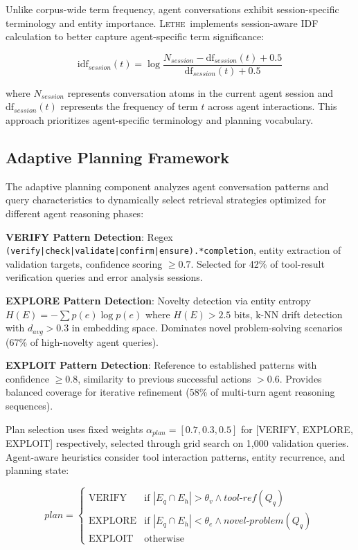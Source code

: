 \documentclass[letterpaper]{article}
\newcommand{\lethe}{\textsc{Lethe}}
\begin{document}
Unlike corpus-wide term frequency, agent conversations exhibit session-specific terminology and entity importance. \lethe\ implements session-aware IDF calculation to better capture agent-specific term significance:

\begin{equation}
\text{idf}_{session}(t) = \log \frac{N_{session} - \text{df}_{session}(t) + 0.5}{\text{df}_{session}(t) + 0.5}
\end{equation}

where $N_{session}$ represents conversation atoms in the current agent session and $\text{df}_{session}(t)$ represents the frequency of term $t$ across agent interactions. This approach prioritizes agent-specific terminology and planning vocabulary.

\subsection{Adaptive Planning Framework}

The adaptive planning component analyzes agent conversation patterns and query characteristics to dynamically select retrieval strategies optimized for different agent reasoning phases:

\textbf{VERIFY Pattern Detection}: Regex \texttt{(verify|check|validate|confirm|ensure).*completion}, entity extraction of validation targets, confidence scoring $\geq 0.7$. Selected for 42\% of tool-result verification queries and error analysis sessions.

\textbf{EXPLORE Pattern Detection}: Novelty detection via entity entropy $H(E) = -\sum p(e) \log p(e)$ where $H(E) > 2.5$ bits, k-NN drift detection with $d_{avg} > 0.3$ in embedding space. Dominates novel problem-solving scenarios (67\% of high-novelty agent queries).

\textbf{EXPLOIT Pattern Detection}: Reference to established patterns with confidence $\geq 0.8$, similarity to previous successful actions $> 0.6$. Provides balanced coverage for iterative refinement (58\% of multi-turn agent reasoning sequences).

Plan selection uses fixed weights $\alpha_{plan} = [0.7, 0.3, 0.5]$ for [VERIFY, EXPLORE, EXPLOIT] respectively, selected through grid search on 1,000 validation queries. Agent-aware heuristics consider tool interaction patterns, entity recurrence, and planning state:

\begin{equation}
plan = \begin{cases}
\text{VERIFY} & \text{if } |E_q \cap E_h| > \theta_v \land tool\text{-}ref(Q_q) \\
\text{EXPLORE} & \text{if } |E_q \cap E_h| < \theta_e \land novel\text{-}problem(Q_q) \\
\text{EXPLOIT} & \text{otherwise}
\end{cases}
\end{equation}
\end{document}
